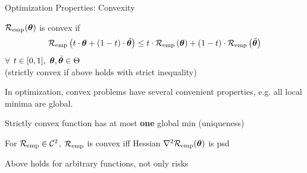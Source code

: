 \documentclass[11pt,compress,t,notes=noshow, xcolor=table]{beamer}
\begin{document}
\begin{vbframe}{Optimization Properties: Convexity}

\begin{itemizeL}

\item $\mathcal{R}_{\text{emp}}(\bm{\theta})$ is convex if
$$
\mathcal{R}_{\text{emp}}\left(t \cdot \bm{\theta} + (1 - t) \cdot \tilde {\bm{\theta}}\right) \le t \cdot
\mathcal{R}_{\text{emp}}\left(\bm{\theta}\right) + (1 - t) \cdot \mathcal{R}_{\text{emp}}\left(\tilde {\bm{\theta}} \right)
$$
$\forall$ $t \in [0, 1], ~\bm{\theta}, \tilde {\bm{\theta}} \in \Theta$\\
(strictly convex if above holds with strict inequality)

\item In optimization, convex problems have several convenient properties, e.g. all local minima are global. 
\item Strictly convex function has at most \textbf{one} global min (uniqueness)

\item For $\mathcal{R}_{\text{emp}} \in \mathcal{C}^{2}$, $\mathcal{R}_{\text{emp}}$ is convex iff Hessian $\nabla^2 \mathcal{R}_{\text{emp}}(\bm{\theta})$ is psd

\item Above holds for arbitrary functions, not only risks
  
\end{itemizeL}

\end{vbframe}

\end{document}
